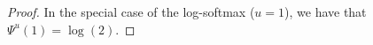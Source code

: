 \begin{appendices}
\begin{proof}
In the special case of the log-softmax ($u=1$), we have that $\Psi^u(1)=\log(2)$. 







\end{proof}
\end{appendices}
